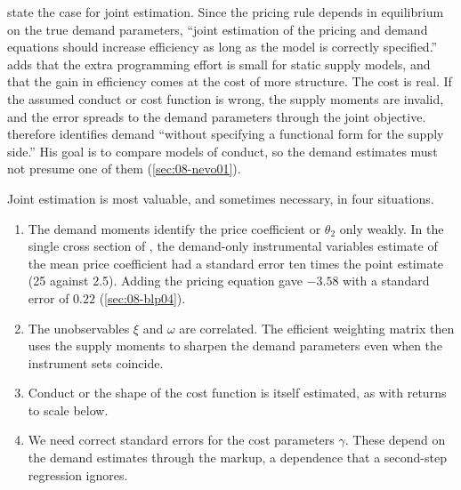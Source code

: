 \citet[p.~851]{BerryLevinsohnPakes1995} state the case for joint estimation. Since the pricing rule depends in
equilibrium on the true demand parameters, ``joint estimation of the pricing and demand equations should increase
efficiency as long as the model is correctly specified.'' \citet[Section~5.1]{Nevo2000a} adds that the extra
programming effort is small for static supply models, and that the gain in efficiency comes at the cost of more
structure. The cost is real. If the assumed conduct or cost function is wrong, the supply moments are invalid, and
the error spreads to the demand parameters through the joint objective. \citet[p.~318]{Nevo2001} therefore identifies
demand ``without specifying a functional form for the supply side.'' His goal is to compare models of conduct, so the
demand estimates must not presume one of them (\cref{sec:08-nevo01}).

Joint estimation is most valuable, and sometimes necessary, in four situations.
\begin{enumerate}
  \item The demand moments identify the price coefficient or $\theta_2$ only weakly. In the single cross section of
  \citet[p.~93]{BerryLevinsohnPakes2004}, the demand-only instrumental variables estimate of the mean price coefficient
  had a standard error ten times the point estimate (25 against 2.5). Adding the pricing equation gave $-3.58$ with a
  standard error of $0.22$ (\cref{sec:08-blp04}).
  \item The unobservables $\xi$ and $\omega$ are correlated. The efficient weighting matrix then uses the supply
  moments to sharpen the demand parameters even when the instrument sets coincide.
  \item Conduct or the shape of the cost function is itself estimated, as with returns to scale below.
  \item We need correct standard errors for the cost parameters $\gamma$. These depend on the demand estimates
  through the markup, a dependence that a second-step regression ignores.
\end{enumerate}

